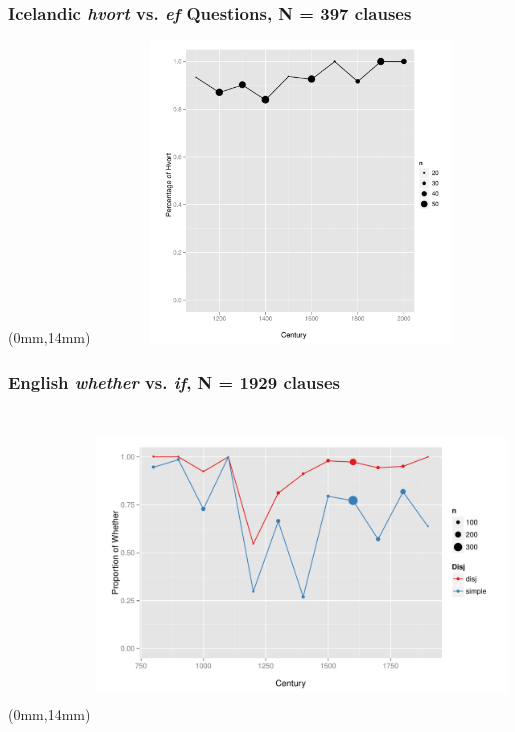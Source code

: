 \documentclass[hyperref={pdfpagelabels=false}]{beamer}
\begin{document}
\begin{frame} 
 \frametitle{Icelandic \textsl{hvort} vs. \textsl{ef} Questions, N = 397 clauses}
\begin{center}
 
 \begin{textblock*}{125mm}(0mm,14mm)
\includegraphics[width=109mm,height=80mm,clip=true,trim=0mm 0mm 0mm 0mm]{whetherifIceSimple.pdf}
\end{textblock*}

\end{center}
\end{frame}

\begin{frame} 
 \frametitle{English \textsl{whether} vs. \textsl{if}, N = 1929 clauses}

\begin{center}
 
 \begin{textblock*}{125mm}(0mm,14mm)
\includegraphics[width=109mm,height=82mm,clip=true,trim=0mm 0mm 0mm 0mm]{whetherifEng.pdf}
\end{textblock*}
\end{center}
\end{frame}
\end{document}
